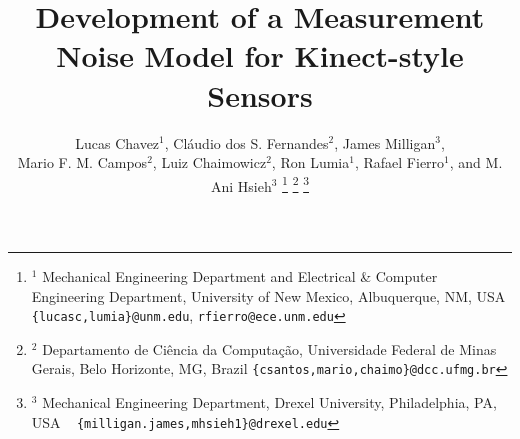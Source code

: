 \documentclass[letterpaper, 10 pt, conference]{ieeeconf}  %
\title{\LARGE \bf
Development of a Measurement Noise Model for Kinect-style Sensors%
}
\author{Lucas Chavez$^{1}$, Cl\'audio dos S. Fernandes$^{2}$, James Milligan$^{3}$, \\
	Mario F. M. Campos$^{2}$, Luiz Chaimowicz$^{2}$, Ron Lumia$^{1}$, Rafael Fierro$^{1}$, and  M. Ani Hsieh$^{3}$%
\thanks{$^{1}$ Mechanical Engineering Department and Electrical \& Computer Engineering Department, University of New Mexico,
	Albuquerque, NM, USA
	{\tt\small \{lucasc,lumia\}@unm.edu},
	{\tt\small rfierro@ece.unm.edu}}
\thanks{$^{2}$ Departamento de Ci\^encia da Computa\c{c}\~ao,
	Universidade Federal de Minas Gerais,
	Belo Horizonte, MG, Brazil
	{\tt\small \{csantos,mario,chaimo\}@dcc.ufmg.br}}
\thanks{$^{3}$ Mechanical Engineering Department, Drexel University,
	Philadelphia, PA, USA ~
	{\tt\small \{milligan.james,mhsieh1\}@drexel.edu}}
}
\begin{document}
\maketitle
\thispagestyle{empty}
\pagestyle{empty}



\begin{abstract}







\end{abstract}
\end{document}
